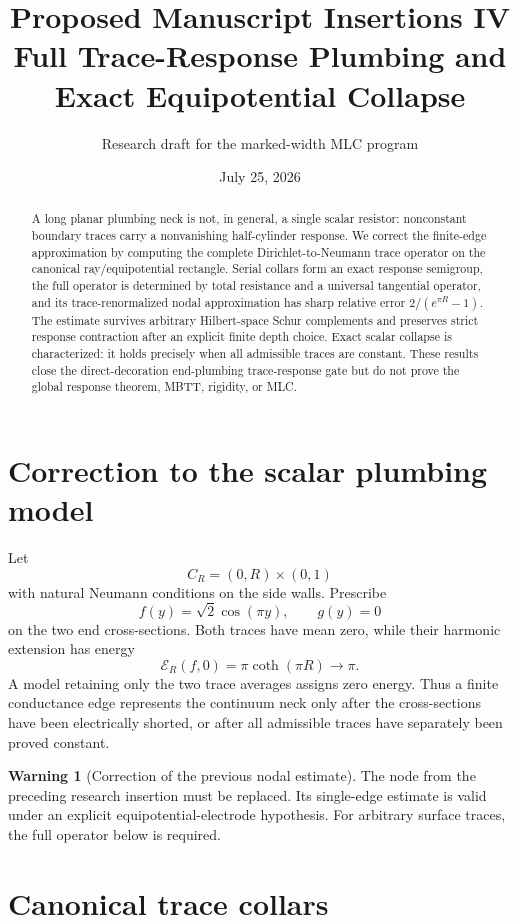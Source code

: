 \documentclass[10pt]{article}
\title{Proposed Manuscript Insertions IV\\
Full Trace-Response Plumbing and Exact Equipotential Collapse}
\author{Research draft for the marked-width MLC program}
\date{July 25, 2026}
\theoremstyle{definition}
\newtheorem{warning}[theorem]{Warning}
\theoremstyle{remark}
\begin{document}
\maketitle

\begin{abstract}
A long planar plumbing neck is not, in general, a single scalar resistor:
nonconstant boundary traces carry a nonvanishing half-cylinder response. We
correct the finite-edge approximation by computing the complete
Dirichlet-to-Neumann trace operator on the canonical ray/equipotential
rectangle. Serial collars form an exact response semigroup, the full operator
is determined by total resistance and a universal tangential operator, and its
trace-renormalized nodal approximation has sharp relative error
$2/(e^{\pi R}-1)$. The estimate survives arbitrary Hilbert-space Schur
complements and preserves strict response contraction after an explicit finite
depth choice. Exact scalar collapse is characterized: it holds precisely when
all admissible traces are constant. These results close the direct-decoration
end-plumbing trace-response gate but do not prove the global response theorem,
MBTT, rigidity, or MLC.
\end{abstract}

\section{Correction to the scalar plumbing model}

Let
\[
 C_R=(0,R)\times(0,1)
\]
with natural Neumann conditions on the side walls. Prescribe
\[
 f(y)=\sqrt2\cos(\pi y),\qquad g(y)=0
\]
on the two end cross-sections. Both traces have mean zero, while their harmonic
extension has energy
\[
 \mathcal E_R(f,0)=\pi\coth(\pi R)\longrightarrow\pi.
\tag{1.1}
\]
A model retaining only the two trace averages assigns zero energy. Thus a
finite conductance edge represents the continuum neck only after the
cross-sections have been electrically shorted, or after all admissible traces
have separately been proved constant.

\begin{warning}[Correction of the previous nodal estimate]
The node  from the preceding
research insertion must be replaced. Its single-edge estimate is valid under
an explicit equipotential-electrode hypothesis. For arbitrary surface traces,
the full operator below is required.
\end{warning}

\section{Canonical trace collars}
\end{document}
